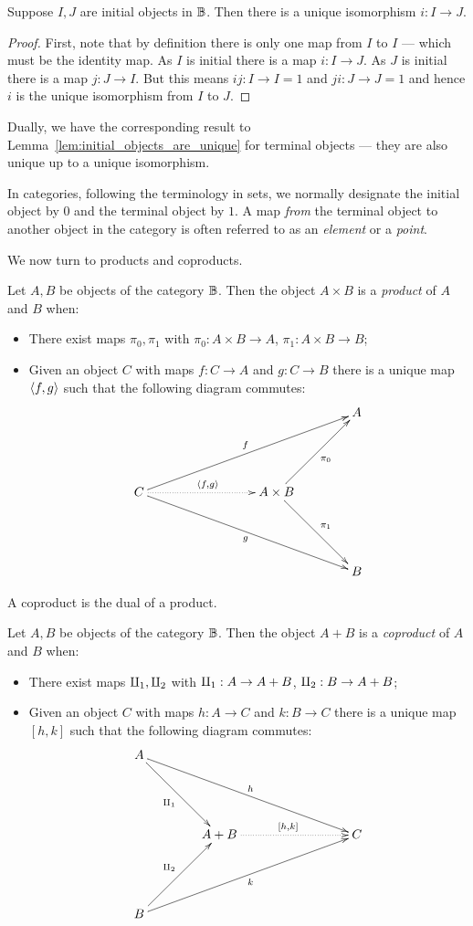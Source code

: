 \begin{lemma}\label{lem:initial_objects_are_unique}
  Suppose $I,J$ are initial objects in $\mathbb{B}$. Then there is a unique isomorphism $i:I \to J$.
\end{lemma}
\begin{proof}
  First, note that by definition there is only one map from $I$ to $I$ --- which must be the
  identity map. As $I$ is initial there is a map $i: I \to J$. As $J$ is initial there is a map
  $j:J \to I$. But this means $i j : I \to I = 1$ and $j i : J \to J = 1$ and hence $i$ is the
  unique isomorphism from $I$ to $J$.
\end{proof}

Dually, we have the corresponding result to Lemma~\ref{lem:initial_objects_are_unique} for terminal
objects --- they are also unique up to a unique isomorphism.

In categories, following the terminology in sets, we normally designate the initial object by $0$
and the terminal object by $1$.
A map \emph{from} the terminal object to another object in the category is often referred to as an
\emph{element} or a \emph{point}.

We now turn to products and coproducts.

\begin{definition}\label{def:categorical_product}
  Let $A,B$ be objects of the category $\mathbb{B}$. Then the object $A \times B$ is a \emph{product} of
  $A$ and $B$ when:
  \begin{itemize}
    \item There exist maps $\pi_0, \pi_1$ with $\pi_0:A\times B \to A$, $\pi_1:A\times B \to B$;
    \item Given an object $C$ with maps $f:C\to A$ and $g:C \to B$ there is a unique map
    $\langle f,g\rangle$ such that the following diagram commutes:
    \[
      \xymatrix@C+15pt@R+25pt{
        &&&A\\
        C\ar[urrr]^{f} \ar[drrr]_{g}\ar@{.>}[rr]^{\<f,g\>} & &A\times B \ar[ur]_{\pi_0}\ar[dr]^{\pi_1}\\
        &&&B
      }
    \]
  \end{itemize}

\end{definition}

A coproduct is the dual of a product.

\begin{definition}\label{def:categorical_coproduct}
  Let $A,B$ be objects of the category $\mathbb{B}$. Then the object $A + B$ is a \emph{coproduct} of
  $A$ and $B$ when:
  \begin{itemize}
    \item There exist maps $\amalg_{1}, \amalg_{2}$ with $\amalg_{1}:A \to A + B$, $\amalg_{2}:B \to A+ B$;
    \item Given an object $C$ with maps $h:A\to C$ and $k:B \to C$ there is a unique map
    $[h,k]$ such that the following diagram commutes:
    \[
      \xymatrix@C+15pt@R+25pt{
        A \ar[drrr]^h \ar[dr]_{\cpa} \\
        &A +B \ar@{.>}[rr]^{[h,k]} && C\\
        B \ar[urrr]_k \ar[ur]^{\cpb}
      }
    \]
  \end{itemize}
\end{definition}

